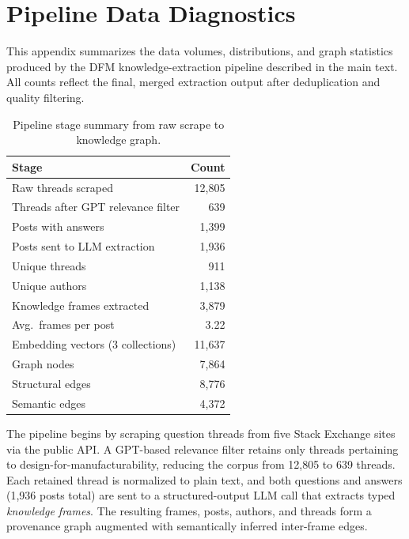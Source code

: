 
\section{Pipeline Data Diagnostics}\label{appendix:diagnostics}

This appendix summarizes the data volumes, distributions, and graph
statistics produced by the DFM knowledge-extraction pipeline described
in the main text.  All counts reflect the final, merged extraction
output after deduplication and quality filtering.


\begin{table}[t]
\caption{Pipeline stage summary from raw scrape to knowledge graph.}
\label{tab:pipeline-summary}
\centering
\begin{tabular}{lr}
\toprule
Stage & Count \\
\midrule
Raw threads scraped           & 12{,}805 \\
Threads after GPT relevance filter & 639 \\
Posts with answers             & 1{,}399 \\
Posts sent to LLM extraction   & 1{,}936 \\
Unique threads                 & 911 \\
Unique authors                 & 1{,}138 \\
Knowledge frames extracted     & 3{,}879 \\
Avg.\ frames per post         & 3.22 \\
Embedding vectors (3 collections) & 11{,}637 \\
Graph nodes                    & 7{,}864 \\
Structural edges               & 8{,}776 \\
Semantic edges                 & 4{,}372 \\
\bottomrule
\end{tabular}
\end{table}

The pipeline begins by scraping question threads from five Stack
Exchange sites via the public API.  A GPT-based relevance filter
retains only threads pertaining to design-for-manufacturability,
reducing the corpus from 12{,}805 to 639 threads.  Each retained
thread is normalized to plain text, and both questions and answers
(1{,}936 posts total) are sent to a structured-output LLM call that
extracts typed \emph{knowledge frames}.  The resulting frames,
posts, authors, and threads form a provenance graph augmented with
semantically inferred inter-frame edges.

